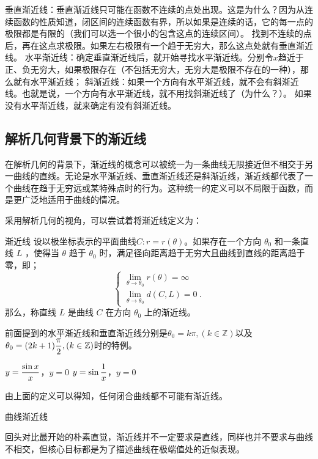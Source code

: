 垂直渐近线：垂直渐近线只可能在函数不连续的点处出现。这是为什么？因为从连续函数的性质知道，闭区间的连续函数有界，所以如果是连续的话，它的每一点的极限都是有限的（我们可以选一个很小的包含这点的连续区间）。
找到不连续的点后，再在这点求极限。如果左右极限有一个趋于无穷大，那么这点处就有垂直渐近线。
水平渐近线：确定垂直渐近线后，就开始寻找水平渐近线。分别令$x$趋近于正、负无穷大，如果极限存在（不包括无穷大，无穷大是极限不存在的一种），那么就有水平渐近线；
斜渐近线：如果一个方向有水平渐近线，就不会有斜渐近线。也就是说，一个方向有水平渐近线，就不用找斜渐近线了（为什么？）。 如果没有水平渐近线，就来确定有没有斜渐近线。



\subsection{解析几何背景下的渐近线}

在解析几何的背景下，渐近线的概念可以被统一为一条曲线无限接近但不相交于另一曲线的直线。无论是水平渐近线、垂直渐近线还是斜渐近线，渐近线都代表了一个曲线在趋于无穷远或某特殊点时的行为。这种统一的定义可以不局限于函数，而是更广泛地适用于曲线的情况。

采用解析几何的视角，可以尝试着将渐近线定义为：

\begin{definition}{渐近线}
设以极坐标表示的平面曲线$C:r=r(\theta)$。如果存在一个方向  $\theta_0$  和一条直线  $L$ ，使得当  $\theta$  趋于  $\theta_0$  时，满足径向距离趋于无穷大且曲线到直线的距离趋于零，即；
\begin{equation}
\begin{cases}
\displaystyle\lim_{\theta \to \theta_0} r(\theta) = \infty\\
\displaystyle\lim_{\theta \to \theta_0} d(C, L) = 0~.
\end{cases}
\end{equation}
那么，称直线  $L$  是曲线  $C$  在方向  $\theta_0$  上的渐近线。
\end{definition}

前面提到的水平渐近线和垂直渐近线分别是$\theta_0=k\pi,(k\in\mathbb{Z})$以及$\displaystyle\theta_0=(2k+1){\pi\over2},(k\in\mathbb{Z})$时的特例。

$\displaystyle y={\sin x\over x}$，$y=0$
$\displaystyle y=\sin {1\over x}$，$y=0$

由上面的定义可以得知，任何闭合曲线都不可能有渐近线。

曲线渐近线

回头对比最开始的朴素直觉，渐近线并不一定要求是直线，同样也并不要求与曲线不相交，但核心目标都是为了描述曲线在极端值处的近似表现。
